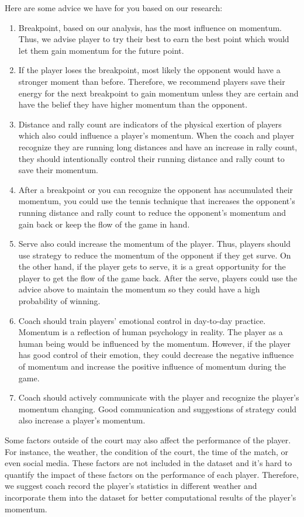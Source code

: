\documentclass[12pt]{article}
\begin{document}
Here are some advice we have for you based on our research: 
\begin{enumerate}
    \item Breakpoint, based on our analysis, has the most influence on momentum. Thus, we advise player to try their best to earn the best point which would let them gain momentum for the future point. 
    \item If the player loses the breakpoint, most likely the opponent would have a stronger moment than before. Therefore, we recommend players save their energy for the next breakpoint to gain momentum unless they are certain and have the belief they have higher momentum than the opponent. 
    \item Distance and rally count are indicators of the physical exertion of players which also could influence a player's momentum. When the coach and player recognize they are running long distances and have an increase in rally count, they should intentionally control their running distance and rally count to save their momentum.
    \item After a breakpoint or you can recognize the opponent has accumulated their momentum, you could use the tennis technique that increases the opponent's running distance and rally count to reduce the opponent's momentum and gain back or keep the flow of the game in hand. 
    \item Serve also could increase the momentum of the player. Thus, players should use strategy to reduce the momentum of the opponent if they get surve. On the other hand, if the player gets to serve, it is a great opportunity for the player to get the flow of the game back. After the serve, players could use the advice above to maintain the momentum so they could have a high probability of winning. 
    \item Coach should train players' emotional control in day-to-day practice. Momentum is a reflection of human psychology in reality. The player as a human being would be influenced by the momentum. However, if the player has good control of their emotion, they could decrease the negative influence of momentum and increase the positive influence of momentum during the game. 
    \item Coach should actively communicate with the player and recognize the player's momentum changing. Good communication and suggestions of strategy could also increase a player's momentum.
\end{enumerate}

Some factors outside of the court may also affect the performance of the player. For instance, the weather, the condition of the court, the time of the match, or even social media. These factors are 
not included in the dataset and it's hard to quantify the impact of these factors on the performance of each player. Therefore, we suggest coach record the player's statistics in different weather and incorporate them into the dataset for better computational results of the player's momentum. 
\end{document}
